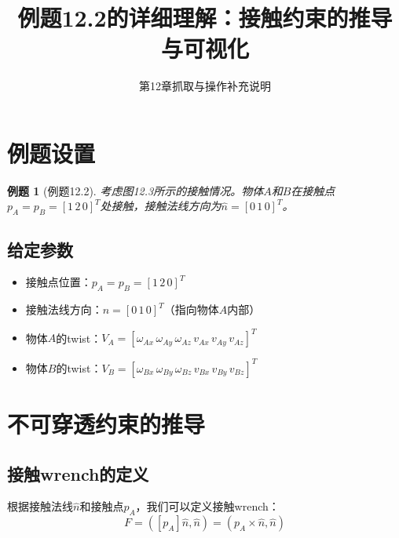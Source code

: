 \documentclass[12pt,a4paper]{article}
\title{例题12.2的详细理解：接触约束的推导与可视化}
\author{第12章抓取与操作补充说明}
\date{}
\newtheorem{example}{例题}
\begin{document}
\maketitle

\section{例题设置}

\begin{example}[例题12.2]
考虑图12.3所示的接触情况。物体$A$和$B$在接触点$p_A = p_B = [1 \, 2 \, 0]^T$处接触，接触法线方向为$\hat{n} = [0 \, 1 \, 0]^T$。
\end{example}

\subsection{给定参数}

\begin{itemize}
\item 接触点位置：$p_A = p_B = [1 \, 2 \, 0]^T$
\item 接触法线方向：$\hat{n} = [0 \, 1 \, 0]^T$（指向物体$A$内部）
\item 物体$A$的twist：$V_A = [\omega_{Ax} \, \omega_{Ay} \, \omega_{Az} \, v_{Ax} \, v_{Ay} \, v_{Az}]^T$
\item 物体$B$的twist：$V_B = [\omega_{Bx} \, \omega_{By} \, \omega_{Bz} \, v_{Bx} \, v_{By} \, v_{Bz}]^T$
\end{itemize}

\section{不可穿透约束的推导}

\subsection{接触wrench的定义}

根据接触法线$\hat{n}$和接触点$p_A$，我们可以定义接触wrench：
\begin{equation}
F = ([p_A] \hat{n}, \hat{n}) = (p_A \times \hat{n}, \hat{n})
\end{equation}
\end{document}
